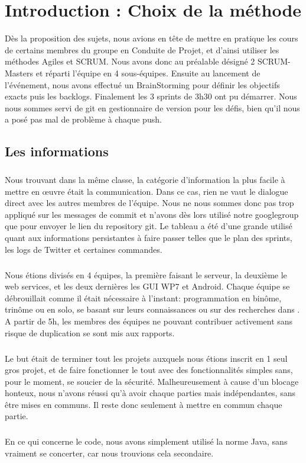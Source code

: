 \documentclass[a4paper,francais,titlepage]{article}
\begin{document}
\section{Introduction : Choix de la méthode}
Dès la proposition des sujets, nous avions en tête de mettre en pratique les cours de certains membres du groupe en Conduite de Projet, et d'ainsi utiliser les méthodes Agiles et SCRUM. Nous avons donc au préalable désigné 2 SCRUM-Masters et réparti l'équipe en 4 sous-équipes. Ensuite au lancement de l'événement, nous avons effectué un BrainStorming pour définir les objectifs exacts puis les backlogs. Finalement les 3 sprints de 3h30 ont pu démarrer. Nous nous sommes servi de git en gestionnaire de version pour les défis, bien qu'il nous a posé pas mal de problème à chaque push.

\subsection*{Les informations}
\subparagraph{}Nous trouvant dans la même classe, la catégorie d'information la plus facile à mettre en œuvre était la communication. Dans ce cas, rien ne vaut le dialogue direct avec les autres membres de l'équipe. Nous ne nous sommes donc pas trop appliqué sur les messages de commit et n'avons dès lors utilisé notre googlegroup que pour envoyer le lien du repository git. Le tableau a été d'une grande utilisé quant aux informations persistantes à faire passer telles que le plan des sprints, les logs de Twitter et certaines commandes.

\subparagraph{}Nous étions divisés en 4 équipes, la première faisant le serveur, la deuxième le web services, et les deux dernières les GUI WP7 et Android. Chaque équipe se débrouillait comme il était nécessaire à l'instant: programmation en binôme, trinôme ou en solo, se basant sur leurs connaissances ou sur des recherches dans . A partir de 5h, les membres des équipes ne pouvant contribuer activement sans risque de duplication se sont mis aux rapports.

\subparagraph{}Le but était de terminer tout les projets auxquels nous étions inscrit en 1 seul gros projet, et de faire fonctionner le tout avec des fonctionnalités simples sans, pour le moment, se soucier de la sécurité. Malheureusement à cause d'un blocage honteux, nous n'avons réussi qu'à avoir chaque parties mais indépendantes, sans être mises en communs. Il reste donc seulement à mettre en commun chaque partie.

\subparagraph{}En ce qui concerne le code, nous avons simplement utilisé la norme Java, sans vraiment se concerter, car nous trouvions cela secondaire.
\end{document}
